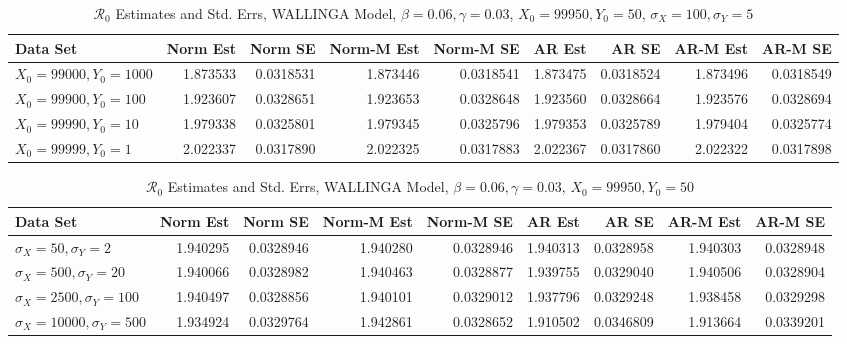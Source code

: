 \message{ !name(draft_v13.tex)}\documentclass[12pt]{article}
\newcommand{\rr}{\ensuremath{\mathcal{R}_0}}
\begin{document}
\begin{table}[H]
	
	\caption{\label{tab:}$\rr$ Estimates and Std. Errs, WALLINGA Model,
		$\beta = 0.06, \gamma = 0.03$, $X_0 = 99950, Y_0 = 50$, $\sigma_X = 100, \sigma_Y = 5$}
	\centering
	\begin{tabular}[t]{l|r|r|r|r|r|r|r|r}
		\hline
		Data Set & Norm Est & Norm SE & Norm-M Est & Norm-M SE & AR Est & AR SE & AR-M Est & AR-M SE\\
		\hline
		$X_0 = 99000, Y_0 = 1000$ & 1.873533 & 0.0318531 & 1.873446 & 0.0318541 & 1.873475 & 0.0318524 & 1.873496 & 0.0318549\\
		\hline
		$X_0 = 99900, Y_0 = 100$ & 1.923607 & 0.0328651 & 1.923653 & 0.0328648 & 1.923560 & 0.0328664 & 1.923576 & 0.0328694\\
		\hline
		$X_0 = 99990, Y_0 = 10$ & 1.979338 & 0.0325801 & 1.979345 & 0.0325796 & 1.979353 & 0.0325789 & 1.979404 & 0.0325774\\
		\hline
		$X_0 = 99999, Y_0 = 1$& 2.022337 & 0.0317890 & 2.022325 & 0.0317883 & 2.022367 & 0.0317860 & 2.022322 & 0.0317898\\
		\hline
	\end{tabular}
\end{table}

\begin{table}[H]
	
	\caption{\label{tab:}$\rr$ Estimates and Std. Errs, WALLINGA Model,
		$\beta = 0.06, \gamma = 0.03$, $X_0 = 99950, Y_0 = 50$}
	\centering
	\begin{tabular}[t]{l|r|r|r|r|r|r|r|r}
		\hline
		Data Set & Norm Est & Norm SE & Norm-M Est & Norm-M SE & AR Est & AR SE & AR-M Est & AR-M SE\\
		\hline
		$\sigma_X = 50, \sigma_Y = 2$ & 1.940295 & 0.0328946 & 1.940280 & 0.0328946 & 1.940313 & 0.0328958 & 1.940303 & 0.0328948\\
		\hline
		$\sigma_X = 500, \sigma_Y = 20$ & 1.940066 & 0.0328982 & 1.940463 & 0.0328877 & 1.939755 & 0.0329040 & 1.940506 & 0.0328904\\
		\hline
		$\sigma_X = 2500, \sigma_Y = 100$ & 1.940497 & 0.0328856 & 1.940101 & 0.0329012 & 1.937796 & 0.0329248 & 1.938458 & 0.0329298\\
		\hline
		$\sigma_X = 10000, \sigma_Y = 500$ & 1.934924 & 0.0329764 & 1.942861 & 0.0328652 & 1.910502 & 0.0346809 & 1.913664 & 0.0339201\\
		\hline
	\end{tabular}
\end{table}
\end{document}
